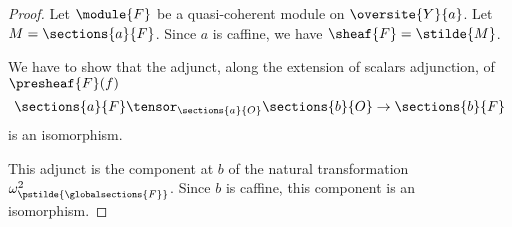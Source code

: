 
\begin{proof}
Let $\module{F}$ be a quasi-coherent module on $\oversite{Y}{a}$.
Let $M = \sections{a}{F}$.
Since $a$ is caffine, we have $\sheaf{F} = \stilde{M}$.

We have to show that the adjunct, along the extension of scalars adjunction, of $\presheaf{F}(f)$
\[\sections{a}{F} \tensor_{\sections{a}{O}} \sections{b}{O} \rightarrow \sections{b}{F}\]
is an isomorphism.

This adjunct is the component at $b$ of the natural transformation $\omega^2_{\pstilde{\globalsections{F}}}$.
Since $b$ is caffine, this component is an isomorphism.
\end{proof}